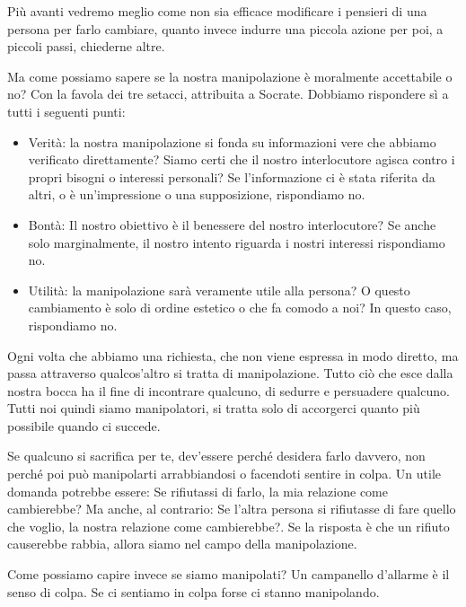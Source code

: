\documentclass[12pt]{book} %
\begin{document}
\bigskip

Più avanti vedremo meglio come non sia efficace modificare i pensieri di una persona per farlo cambiare, quanto invece
indurre una piccola azione per poi, a piccoli passi, chiederne altre.

Ma come possiamo sapere se la nostra manipolazione è moralmente accettabile o no? Con la favola dei tre setacci,
attribuita a Socrate. Dobbiamo rispondere sì a tutti i seguenti punti: 

\begin{itemize}
\item Verità: la nostra manipolazione si fonda su informazioni vere che abbiamo verificato direttamente? Siamo certi che
il nostro interlocutore agisca contro i propri bisogni o interessi personali? Se l'informazione ci
è stata riferita da altri, o è un'impressione o una supposizione, rispondiamo no. 
\item Bontà: Il nostro obiettivo è il benessere del nostro interlocutore? Se anche solo marginalmente, il nostro intento
riguarda i nostri interessi rispondiamo no. 
\item Utilità: la manipolazione sarà veramente utile alla persona? O questo cambiamento è solo di ordine estetico o che
fa comodo a noi? In questo caso, rispondiamo no. 
\end{itemize}

\bigskip

Ogni volta che abbiamo una richiesta, che non viene espressa in modo diretto, ma passa attraverso
qualcos'altro si tratta di manipolazione. Tutto ciò che esce dalla nostra bocca ha il fine di
incontrare qualcuno, di sedurre e persuadere qualcuno. Tutti noi quindi siamo manipolatori, si tratta solo di
accorgerci quanto più possibile quando ci succede.


\bigskip

Se qualcuno si sacrifica per te, dev'essere perché desidera farlo davvero, non perché poi può
manipolarti arrabbiandosi o facendoti sentire in colpa. Un utile domanda potrebbe essere: Se rifiutassi di farlo, la
mia relazione come cambierebbe? Ma anche, al contrario: Se l'altra persona si rifiutasse di fare
quello che voglio, la nostra relazione come cambierebbe?. Se la risposta è che un rifiuto causerebbe rabbia, allora
siamo nel campo della manipolazione.


\bigskip

Come possiamo capire invece se siamo manipolati? Un campanello d'allarme è il senso di colpa. Se ci sentiamo in colpa
forse ci stanno manipolando.
\end{document}
